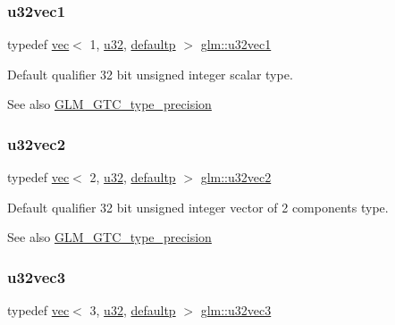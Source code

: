 \subsubsection{\texorpdfstring{u32vec1}{u32vec1}}
{\footnotesize\ttfamily typedef \hyperlink{structglm_1_1vec}{vec}$<$ 1, \hyperlink{group__gtc__type__precision_ga54e837745059fd29017bed71cfa0a8db}{u32}, \hyperlink{namespaceglm_a36ed105b07c7746804d7fdc7cc90ff25a9d21ccd8b5a009ec7eb7677befc3bf51}{defaultp} $>$ \hyperlink{group__gtc__type__precision_ga99f64714ce341e34036bd10c8b36823a}{glm\+::u32vec1}}

Default qualifier 32 bit unsigned integer scalar type. \begin{DoxySeeAlso}{See also}
\hyperlink{group__gtc__type__precision}{G\+L\+M\+\_\+\+G\+T\+C\+\_\+type\+\_\+precision} 
\end{DoxySeeAlso}
\mbox{\label{group__gtc__type__precision_gad854a1005ce84d8f6e8f05e42893f5c9}} 
\subsubsection{\texorpdfstring{u32vec2}{u32vec2}}
{\footnotesize\ttfamily typedef \hyperlink{structglm_1_1vec}{vec}$<$ 2, \hyperlink{group__gtc__type__precision_ga54e837745059fd29017bed71cfa0a8db}{u32}, \hyperlink{namespaceglm_a36ed105b07c7746804d7fdc7cc90ff25a9d21ccd8b5a009ec7eb7677befc3bf51}{defaultp} $>$ \hyperlink{group__gtc__type__precision_gad854a1005ce84d8f6e8f05e42893f5c9}{glm\+::u32vec2}}

Default qualifier 32 bit unsigned integer vector of 2 components type. \begin{DoxySeeAlso}{See also}
\hyperlink{group__gtc__type__precision}{G\+L\+M\+\_\+\+G\+T\+C\+\_\+type\+\_\+precision} 
\end{DoxySeeAlso}
\mbox{\label{group__gtc__type__precision_ga342e504c37b635393e6747b85147151f}} 
\subsubsection{\texorpdfstring{u32vec3}{u32vec3}}
{\footnotesize\ttfamily typedef \hyperlink{structglm_1_1vec}{vec}$<$ 3, \hyperlink{group__gtc__type__precision_ga54e837745059fd29017bed71cfa0a8db}{u32}, \hyperlink{namespaceglm_a36ed105b07c7746804d7fdc7cc90ff25a9d21ccd8b5a009ec7eb7677befc3bf51}{defaultp} $>$ \hyperlink{group__gtc__type__precision_ga342e504c37b635393e6747b85147151f}{glm\+::u32vec3}}

